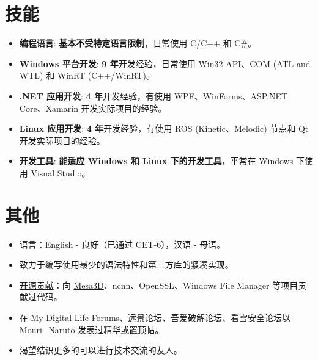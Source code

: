 \documentclass{resume}
\begin{document}
\section{技能}
\begin{itemize}

  \item \textbf{编程语言}:
    \textbf{基本不受特定语言限制}，日常使用 C/C++ 和 C\#。

  \item \textbf{Windows 平台开发}:
    \textbf{9 年}开发经验，日常使用 Win32 API、COM (ATL and WTL) 和 WinRT (C++/WinRT)。

  \item \textbf{.NET 应用开发}:
    \textbf{4 年}开发经验，有使用 WPF、WinForms、ASP.NET Core、Xamarin 开发实际项目的经验。
  
  \item \textbf{Linux 应用开发}:
    \textbf{4 年}开发经验，有使用 ROS (Kinetic、Melodic) 节点和 Qt 开发实际项目的经验。

  \item \textbf{开发工具}:
    \textbf{能适应 Windows 和 Linux 下的开发工具}，平常在 Windows 下使用 Visual Studio。

\end{itemize}

\section{其他}
\begin{itemize}

  \item 语言：English - 良好（已通过 CET-6），汉语 - 母语。

  \item 致力于编写使用最少的语法特性和第三方库的紧凑实现。

  \item \href{https://github.com/search?q=is%3Apr%20author%3AMouriNaruto&type=pullrequests}{开源贡献}：向 \href{https://gitlab.freedesktop.org/mesa/mesa/-/merge_requests/22961}{Mesa3D}、ncnn、OpenSSL、Windows File Manager 等项目贡献过代码。
  
  \item 在 My Digital Life Forums、远景论坛、吾爱破解论坛、看雪安全论坛以 Mouri\_Naruto 发表过精华或置顶帖。
  
  \item 渴望结识更多的可以进行技术交流的友人。
  
\end{itemize}
\end{document}
